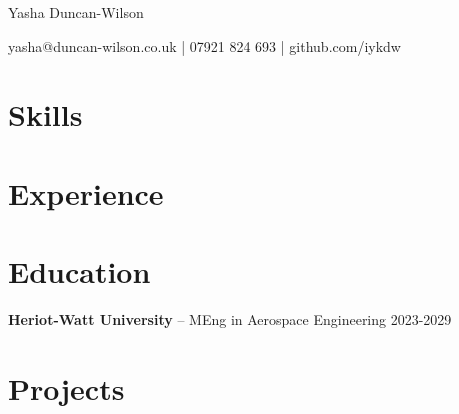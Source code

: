 \documentclass[10pt,a4paper]{article}
\begin{document}
\centerline{\Huge Yasha Duncan-Wilson}

\vspace{5pt}

\centerline{yasha@duncan-wilson.co.uk | 07921 824 693 | github.com/iykdw}

\vspace{8pt}

\vspace{-12pt}

\section*{Skills}

\vspace{-12pt}

\section*{Experience}

\vspace{-12pt}

\section*{Education}
\textbf{Heriot-Watt University} -- MEng in Aerospace Engineering \hfill 2023-2029 \\
\vspace{-12pt}

\section*{Projects}

\end{document}
